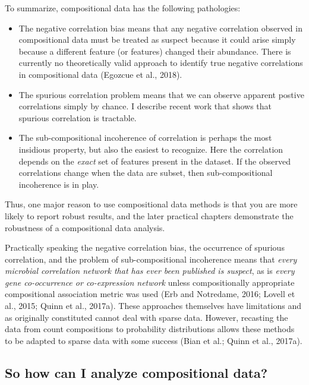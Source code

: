 \documentclass[twocolumn]{article}
\begin{document}
To summarize, compositional data has the following pathologies:

\begin{itemize}
\item
  The negative correlation bias means that any negative correlation
  observed in compositional data must be treated as suspect because it
  could arise simply because a different feature (or features) changed
  their abundance. There is currently no theoretically valid approach to
  identify true negative correlations in compositional data (Egozcue et
  al., 2018).
\item
  The spurious correlation problem means that we can observe apparent
  postive correlations simply by chance. I describe recent work that
  shows that spurious correlation is tractable.
\item
  The sub-compositional incoherence of correlation is perhaps the most
  insidious property, but also the easiest to recognize. Here the
  correlation depends on the \emph{exact} set of features present in the
  dataset. If the observed correlations change when the data are subset,
  then sub-compositional incoherence is in play.
\end{itemize}

Thus, one major reason to use compositional data methods is that you are
more likely to report robust results, and the later practical chapters
demonstrate the robustness of a compositional data analysis.

Practically speaking the negative correlation bias, the occurrence of
spurious correlation, and the problem of sub-compositional incoherence
means that
\emph{every microbial correlation network that has ever been published is suspect},
as is \emph{every gene co-occurrence or co-expression network} unless
compositionally appropriate compositional association metric was used
(Erb and Notredame, 2016; Lovell et al., 2015; Quinn et al., 2017a).
These approaches themselves have limitations and as originally
constituted cannot deal with sparse data. However, recasting the data
from count compositions to probability distributions allows these
methods to be adapted to sparse data with some success (Bian et al.;
Quinn et al., 2017a).

\subsection{So how can I analyze compositional
data?}\label{so-how-can-i-analyze-compositional-data}
\end{document}
